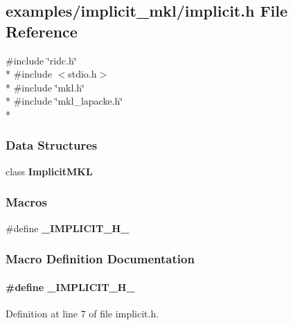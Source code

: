 \subsection{examples/implicit\+\_\+mkl/implicit.h File Reference}
\label{implicit_8h}
{\ttfamily \#include \char`\"{}ridc.\+h\char`\"{}}\\*
{\ttfamily \#include $<$stdio.\+h$>$}\\*
{\ttfamily \#include \char`\"{}mkl.\+h\char`\"{}}\\*
{\ttfamily \#include \char`\"{}mkl\+\_\+lapacke.\+h\char`\"{}}\\*
\subsubsection*{Data Structures}
\begin{DoxyCompactItemize}
\item 
class {\bf Implicit\+M\+K\+L}
\end{DoxyCompactItemize}
\subsubsection*{Macros}
\begin{DoxyCompactItemize}
\item 
\#define {\bf \+\_\+\+I\+M\+P\+L\+I\+C\+I\+T\+\_\+\+H\+\_\+}
\end{DoxyCompactItemize}


\subsubsection{Macro Definition Documentation}
\paragraph[{\+\_\+\+I\+M\+P\+L\+I\+C\+I\+T\+\_\+\+H\+\_\+}]{\setlength{\rightskip}{0pt plus 5cm}\#define \+\_\+\+I\+M\+P\+L\+I\+C\+I\+T\+\_\+\+H\+\_\+}\label{implicit_8h_ae86b67c4f0c0cc9a5f89ed888e72b8d0}


Definition at line 7 of file implicit.\+h.

